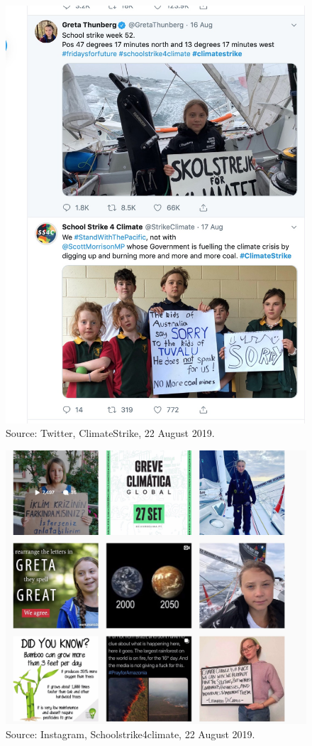 \documentclass[fleqn,10pt]{olplainarticle}
\begin{document}
\begin{figure}[ht]
\centering
\includegraphics[width=0.5\linewidth]{Climatestrike_twitter}
\caption{Source: Twitter, ClimateStrike, 22 August 2019.}
\label{fig:view}
\end{figure}

\begin{figure}[ht]
\centering
\includegraphics[width=0.5\linewidth]{Climatestrike_insta}
\caption{Source: Instagram, Schoolstrike4climate, 22 August 2019.}
\label{fig:view}
\end{figure}
\end{document}
